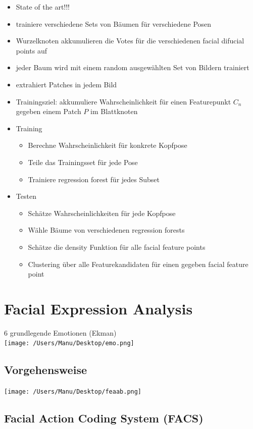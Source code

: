 \documentclass[paper=a4, fontsize=11pt]{scrartcl} %
\numberwithin{equation}{section} %
\numberwithin{figure}{section} %
\numberwithin{table}{section} %
\begin{document}
\begin{itemize}
\item State of the art!!!
\item trainiere verschiedene Sets von Bäumen für verschiedene Posen
\item Wurzelknoten akkumulieren die Votes für die verschiedenen facial difucial points auf
\item jeder Baum wird mit einem random ausgewählten Set von Bildern trainiert
\item extrahiert Patches in jedem Bild
\item Trainingsziel: akkumuliere Wahrscheinlichkeit für einen Featurepunkt $C_n$ gegeben einem Patch $P$ im Blattknoten
\item Training
\begin{itemize}
\item Berechne Wahrscheinlichkeit für konkrete Kopfpose
\item Teile das Trainingsset für jede Pose
\item Trainiere regression forest für jedes Subset
\end{itemize}
\item Testen
\begin{itemize}
\item Schätze Wahrscheinlichkeiten für jede Kopfpose
\item Wähle Bäume von verschiedenen regression forests
\item Schätze die density Funktion für alle facial feature points
\item Clustering über alle Featurekandidaten für einen gegeben facial feature point
\end{itemize}
\end{itemize}

\section{Facial Expression Analysis}

6 grundlegende Emotionen (Ekman)\\
\texttt{[image: /Users/Manu/Desktop/emo.png]}

\subsection{Vorgehensweise}

\texttt{[image: /Users/Manu/Desktop/feaab.png]}

\subsection{Facial Action Coding System (FACS)}
\end{document}

